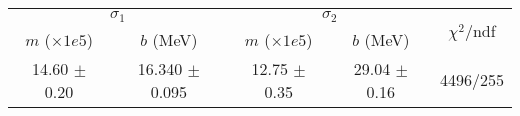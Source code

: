\begin{tabular}{cc|cc||c}
\multicolumn{2}{c|}{$\sigma_1$} & \multicolumn{2}{|c}{$\sigma_2$}  & \multirow{2}{*}{$\chi^2/$ndf}\\
$m$ ($\times1e5$) & $b$ (MeV) & $m$ ($\times1e5$) & $b$ (MeV)  & \\
\hline
14.60 $\pm$ 0.20 & 16.340 $\pm$ 0.095 & 12.75 $\pm$ 0.35 & 29.04 $\pm$ 0.16 & 4496/255\\
\end{tabular}
